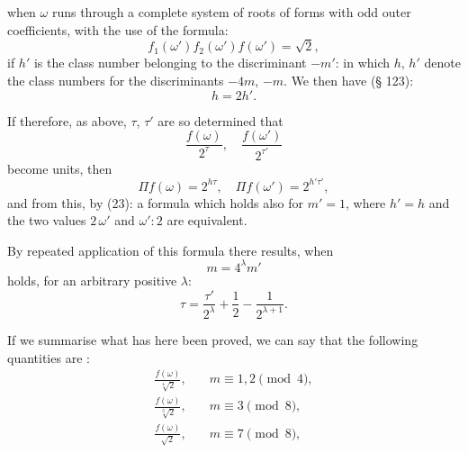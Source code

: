 
when $\omega$ runs through a complete system of roots of forms with odd
outer coefficients, with the use of the formula:
\[
f_1(\omega')f_2(\omega')f(\omega') = \sqrt{2},
\]
if $h'$ is the class number belonging to the discriminant $-m'$:
in which $h$, $h'$ denote the class numbers for the discriminants $-4m$,
$-m$. We then have (§ 123):
\[
h = 2h'.
\]

If therefore, as above, $\tau$, $\tau'$ are so determined that
\[
\frac{f(\omega)}{2^\tau}, \quad \frac{f(\omega')}{2^{\tau'}}
\]
become units, then
\[
\Pi f(\omega) = 2^{h\tau}, \quad \Pi f(\omega') = 2^{h'\tau'},
\]
and from this, by (23):
a formula which holds also for $m' = 1$, where $h' = h$ and
the two values $2\,\omega'$ and $\omega' : 2$ are equivalent.

By repeated application of this formula there results, when
\[
m = 4^\lambda m'
\]
holds, for an arbitrary positive $\lambda$:
\[
\tau = \frac{\tau'}{2^\lambda} + \frac{1}{2} - \frac{1}{2^{\lambda+1}}.
\]

If we summarise what has here been proved, we can
say that the following quantities are :
\[
\begin{aligned}
\frac{f(\omega)}{\sqrt[4]{2}}, & \quad m \equiv 1, 2 \pmod 4, \\
\frac{f(\omega)}{\sqrt[3]{2}}, & \quad m \equiv 3 \pmod 8, \\
\frac{f(\omega)}{\sqrt{2}}, & \quad m \equiv 7 \pmod 8,
\end{aligned}
\]
